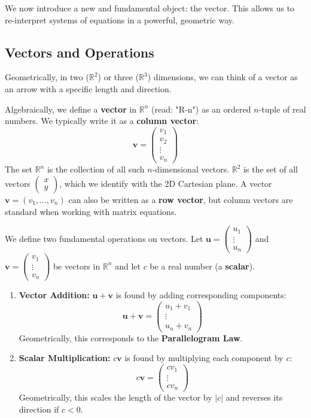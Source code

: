 \documentclass[oneside]{book}
\begin{document}
We now introduce a new and fundamental object: the vector. This allows us to re-interpret systems of equations in a powerful, geometric way.

\subsection{Vectors and Operations}
Geometrically, in two ($\mathbb{R}^2$) or three ($\mathbb{R}^3$) dimensions, we can think of a vector as an arrow with a specific length and direction.


Algebraically, we define a \textbf{vector} in $\mathbb{R}^n$ (read: "R-n") as an ordered $n$-tuple of real numbers. We typically write it as a \textbf{column vector}:
\[ \mathbf{v} = \begin{pmatrix} v_1 \\ v_2 \\ \vdots \\ v_n \end{pmatrix} \]
The set $\mathbb{R}^n$ is the collection of all such $n$-dimensional vectors. $\mathbb{R}^2$ is the set of all vectors $\begin{pmatrix} x \\ y \end{pmatrix}$, which we identify with the 2D Cartesian plane.
A vector $\mathbf{v} = (v_1, \ldots, v_n)$ can also be written as a \textbf{row vector}, but column vectors are standard when working with matrix equations.

We define two fundamental operations on vectors. Let $\mathbf{u} = \begin{pmatrix} u_1 \\ \vdots \\ u_n \end{pmatrix}$ and $\mathbf{v} = \begin{pmatrix} v_1 \\ \vdots \\ v_n \end{pmatrix}$ be vectors in $\mathbb{R}^n$ and let $c$ be a real number (a \textbf{scalar}).

\begin{enumerate}
    \item \textbf{Vector Addition:} $\mathbf{u} + \mathbf{v}$ is found by adding corresponding components:
    \[ \mathbf{u} + \mathbf{v} = \begin{pmatrix} u_1 + v_1 \\ \vdots \\ u_n + v_n \end{pmatrix} \]
    Geometrically, this corresponds to the \textbf{Parallelogram Law}.
    \item \textbf{Scalar Multiplication:} $c\mathbf{v}$ is found by multiplying each component by $c$:
    \[ c\mathbf{v} = \begin{pmatrix} cv_1 \\ \vdots \\ cv_n \end{pmatrix} \]
    Geometrically, this scales the length of the vector by $|c|$ and reverses its direction if $c < 0$.
\end{enumerate}
\end{document}

